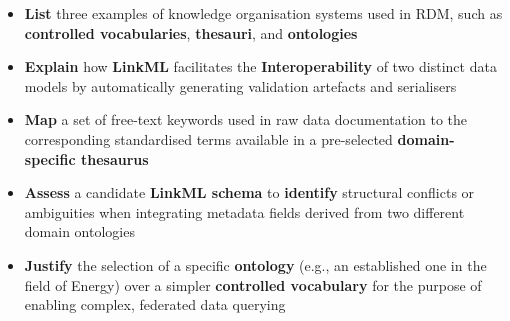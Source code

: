 \documentclass[11pt]{tibop-article}
\begin{document}
\begin{itemize}
    \item \textbf{List} three examples of knowledge organisation systems used in RDM, such as \textbf{controlled vocabularies}, \textbf{thesauri}, and \textbf{ontologies}
        \item \textbf{Explain} how \textbf{LinkML} facilitates the \textbf{Interoperability} of two distinct data models by automatically generating validation artefacts and serialisers
    \item \textbf{Map} a set of free-text keywords used in raw data documentation to the corresponding standardised terms available in a pre-selected \textbf{domain-specific thesaurus}
        \item \textbf{Assess} a candidate \textbf{LinkML schema} to \textbf{identify} structural conflicts or ambiguities when integrating metadata fields derived from two different domain ontologies 
    \item \textbf{Justify} the selection of a specific \textbf{ontology} (e.g., an established one in the field of Energy) over a simpler \textbf{controlled vocabulary} for the purpose of enabling complex, federated data querying

\end{itemize}
\end{document}
